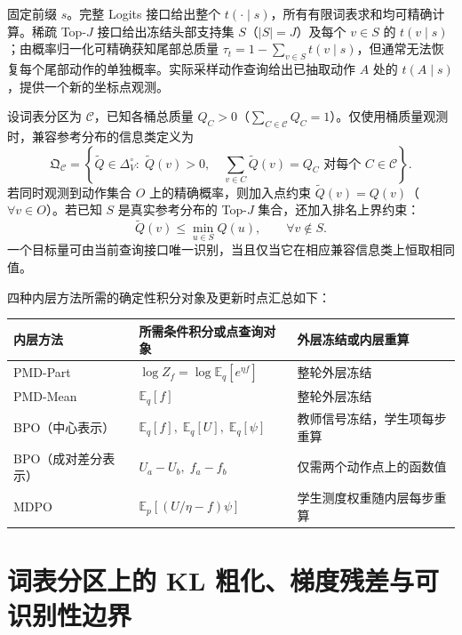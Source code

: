 \documentclass[lang=cn,scheme=chinese,openany]{elegantbook}
\newcommand{\E}{\mathbb E}
\begin{document}
固定前缀 $s$。完整 Logits 接口给出整个 $t(\cdot\mid s)$，所有有限词表求和均可精确计算。稀疏 Top-$J$ 接口给出冻结头部支持集 $S$（$|S|=J$）及每个 $v\in S$ 的 $t(v\mid s)$；由概率归一化可精确获知尾部总质量 $\tau_t=1-\sum_{v\in S}t(v\mid s)$，但通常无法恢复每个尾部动作的单独概率。实际采样动作查询给出已抽取动作 $A$ 处的 $t(A\mid s)$，提供一个新的坐标点观测。

\begin{definition}[与观测一致的兼容参考分布类]
\label{inf:compatible}
设词表分区为 $\mathcal C$，已知各桶总质量 $Q_C>0$（$\sum_{C\in\mathcal C}Q_C=1$）。仅使用桶质量观测时，兼容参考分布的信息类定义为
\begin{equation}
\mathfrak Q_{\mathcal C}=\left\{\widetilde Q\in\Delta_V^\circ:\;\widetilde Q(v)>0,\quad \sum_{v\in C}\widetilde Q(v)=Q_C\text{ 对每个 }C\in\mathcal C\right\}.
\end{equation}
若同时观测到动作集合 $O$ 上的精确概率，则加入点约束 $\widetilde Q(v)=Q(v)$（$\forall v\in O$）。若已知 $S$ 是真实参考分布的 Top-$J$ 集合，还加入排名上界约束：
\begin{equation}
\widetilde Q(v)\leq\min_{u\in S}Q(u),\qquad \forall v\notin S.
\end{equation}
一个目标量可由当前查询接口唯一识别，当且仅当它在相应兼容信息类上恒取相同值。
\end{definition}

四种内层方法所需的确定性积分对象及更新时点汇总如下：
\begin{center}
\begin{tabular}{lll}
\toprule
内层方法 & 所需条件积分或点查询对象 & 外层冻结或内层重算\\
\midrule
PMD-Part & $\log Z_f=\log\E_q[e^{\eta f}]$ & 整轮外层冻结\\
PMD-Mean & $\E_q[f]$ & 整轮外层冻结\\
BPO（中心表示） & $\E_q[f],\;\E_q[U],\;\E_q[\psi]$ & 教师信号冻结，学生项每步重算\\
BPO（成对差分表示） & $U_a-U_b,\; f_a-f_b$ & 仅需两个动作点上的函数值\\
MDPO & $\E_p[(U/\eta-f)\psi]$ & 学生测度权重随内层每步重算\\
\bottomrule
\end{tabular}
\end{center}

\section{词表分区上的 KL 粗化、梯度残差与可识别性边界}
\label{inf:sec:kl-partition-geometry}
\label{inf:sec:kl-partition}
\label{inf:identification}
\end{document}
